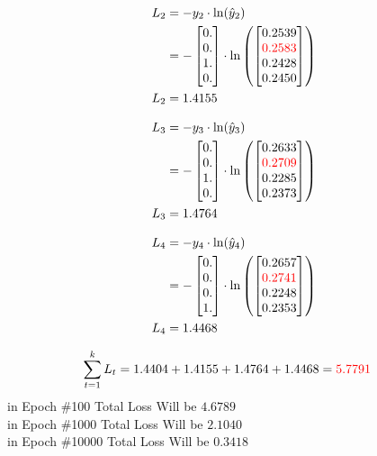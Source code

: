 \documentclass{article}
\begin{document}
\begin{align*}
    L_2 &= -y_2 \cdot \ln(\hat{y}_2) \\
    &= -\begin{bmatrix} 0. \\ 0. \\ 1. \\ 0. \end{bmatrix} \cdot \ln\left(\begin{bmatrix}
0.2539 \\
\textcolor{red}{0.2583} \\
0.2428 \\
0.2450 \\
\end{bmatrix}\right) \\
    L_2 &= 1.4155
\end{align*}

\begin{align*}
    L_3 &= -y_3 \cdot \ln(\hat{y}_3) \\
    &= -\begin{bmatrix} 0. \\ 0. \\ 1. \\ 0. \end{bmatrix} \cdot \ln\left(\begin{bmatrix}
0.2633 \\
\textcolor{red}{0.2709} \\
0.2285 \\
0.2373 \\
\end{bmatrix}\right) \\
    L_3 &= 1.4764
\end{align*}

\begin{align*}
    L_4 &= -y_4 \cdot \ln(\hat{y}_4) \\
    &= -\begin{bmatrix} 0. \\ 0. \\ 0. \\ 1. \end{bmatrix} \cdot \ln\left(\begin{bmatrix}
0.2657 \\
\textcolor{red}{0.2741} \\
0.2248 \\
0.2353 \\
\end{bmatrix}\right) \\
    L_4 &= 1.4468
\end{align*}

\begin{align*}
    \sum_{t=1}^k L_t & = 1.4404 + 1.4155 + 1.4764 + 1.4468 = \textcolor{red}{5.7791}
\end{align*}
in Epoch \#100 Total Loss Will be  $4.6789$\\
in Epoch \#1000 Total Loss Will be $2.1040$\\
in Epoch \#10000 Total Loss Will be $0.3418$
\end{document}
